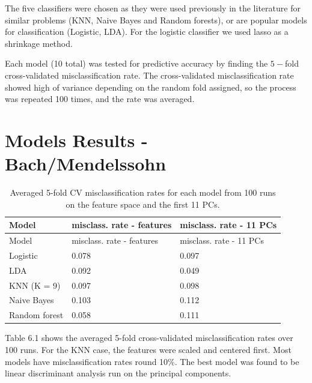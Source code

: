 \documentclass[12pt,twoside]{reedthesis}
\theoremstyle{definition}
\theoremstyle{definition}
\theoremstyle{definition}
\theoremstyle{remark}
\begin{document}
The five classifiers were chosen as they were used previously in the
literature for similar problems (KNN, Naive Bayes and Random forests),
or are popular models for classification (Logistic, LDA). For the
logistic classifier we used lasso as a shrinkage method.

Each model (10 total) was tested for predictive accuracy by finding the
\(5-\)fold cross-validated misclassification rate. The cross-validated
misclassification rate showed high of variance depending on the random
fold assigned, so the process was repeated 100 times, and the rate was
averaged.

\section{Models Results -
Bach/Mendelssohn}\label{models-results---bachmendelssohn}
\begin{longtable}[]{@{}lll@{}}
\caption{Averaged 5-fold CV misclassification rates for each model from
100 runs on the feature space and the first 11 PCs.}\tabularnewline
\toprule
Model & misclass. rate - features & misclass. rate - 11
PCs\tabularnewline
\midrule
\endfirsthead
\toprule
Model & misclass. rate - features & misclass. rate - 11
PCs\tabularnewline
\midrule
\endhead
Logistic & 0.078 & 0.097\tabularnewline
LDA & 0.092 & 0.049\tabularnewline
KNN (K = 9) & 0.097 & 0.098\tabularnewline
Naive Bayes & 0.103 & 0.112\tabularnewline
Random forest & 0.058 & 0.111\tabularnewline
\bottomrule
\end{longtable}
Table 6.1 shows the averaged 5-fold cross-validated misclassification
rates over 100 runs. For the KNN case, the features were scaled and
centered first. Most models have misclassification rates round 10\%. The
best model was found to be linear discriminant analysis run on the
principal components.
\end{document}
